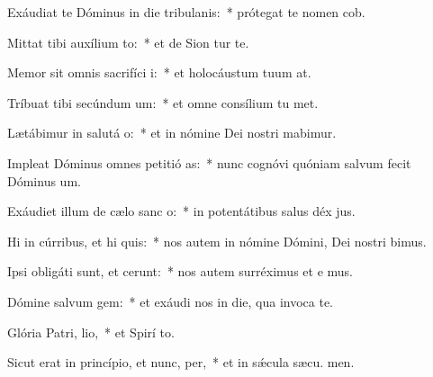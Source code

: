 \item Exáudiat te Dóminus in die tribulanis:~* prótegat te nomen  cob.
\item Mittat tibi auxílium  to:~* et de Sion tur te.
\item Memor sit omnis sacrifíci i:~* et holocáustum tuum  at.
\item Tríbuat tibi secúndum  um:~* et omne consílium tu met.
\item Lætábimur in salutá o:~* et in nómine Dei nostri mabimur.
\item Impleat Dóminus omnes petitió as:~* nunc cognóvi quóniam salvum fecit Dóminus  um.
\item Exáudiet illum de cælo sanc o:~* in potentátibus salus déx jus.
\item Hi in cúrribus, et hi  quis:~* nos autem in nómine Dómini, Dei nostri bimus.
\item Ipsi obligáti sunt, et cerunt:~* nos autem surréximus et e mus.
\item Dómine salvum  gem:~* et exáudi nos in die, qua invoca te.
\item Glória Patri,  lio,~* et Spirí to.
\item Sicut erat in princípio, et nunc,  per,~* et in sǽcula sæcu. men.
